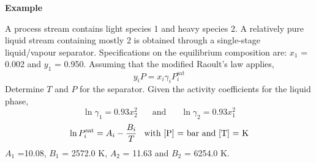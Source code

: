    \begin{MyExample}{\begin{center}{\bf Example}\end{center}}
     \begin{example}\label{Chapter:SolutionThermodynamics:Example1} %
        A process stream contains light species 1 and heavy species 2. A relatively pure liquid stream containing mostly 2 is obtained through a single-stage liquid/vapour separator. Specifications on the equilibrium composition are: $x_{1}$ = 0.002 and $y_{1}$ = 0.950. Assuming that the modified Raoult's law applies, 
\begin{displaymath}
  y_{i} P = x_{i}\gamma_{i}P_{i}^{\text{sat}}
\end{displaymath} 
Determine $T$ and $P$ for the separator. Given the activity coefficients for the liquid phase,
\begin{displaymath}
\ln\gamma_{1} = 0.93x_{2}^{2} \;\;\;\;\;\text{ and }\;\;\;\;\;\ln\gamma_{2}=0.93x_{1}^{2}
\end{displaymath}
\begin{displaymath}
\ln P_{i}^{\text{sat}} = A_{i} - \displaystyle\frac{B_{i}}{T}\;\;\;\text{with [P] = bar and [T] = K}
\end{displaymath} 
$A_{1}$ =10.08, $B_{1}$ = 2572.0 K, $A_{2}$ = 11.63 and $B_{2}$ = 6254.0 K.
     \end{example}


\end{MyExample}
